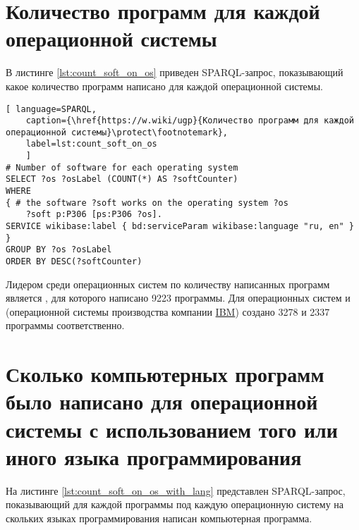 \section{Количество программ для каждой операционной системы}
В листинге \ref{lst:count_soft_on_os} приведен SPARQL-запрос, показывающий какое количество программ написано для каждой операционной системы.

\begin{lstlisting}[ language=SPARQL, 
	caption={\href{https://w.wiki/ugp}{Количество программ для каждой операционной системы}\protect\footnotemark},
	label=lst:count_soft_on_os
	]
# Number of software for each operating system
SELECT ?os ?osLabel (COUNT(*) AS ?softCounter)
WHERE
{ # the software ?soft works on the operating system ?os
	?soft p:P306 [ps:P306 ?os].
SERVICE wikibase:label { bd:serviceParam wikibase:language "ru, en" }
}
GROUP BY ?os ?osLabel
ORDER BY DESC(?softCounter)
\end{lstlisting}

Лидером среди операционных систем по количеству написанных программ является , для которого написано \num{9223} программы. Для операционных систем  и   (операционной системы производства компании \href{https://www.wikidata.org/wiki/Q37156}{IBM}) создано \num{3278} и \num{2337} программы соответственно.

\section{Сколько компьютерных программ было написано для операционной системы с использованием того или иного языка программирования}
На листинге \ref{lst:count_soft_on_os_with_lang} представлен SPARQL-запрос, показывающий для каждой программы под каждую операционную систему на скольких языках программирования написан компьютерная программа.

